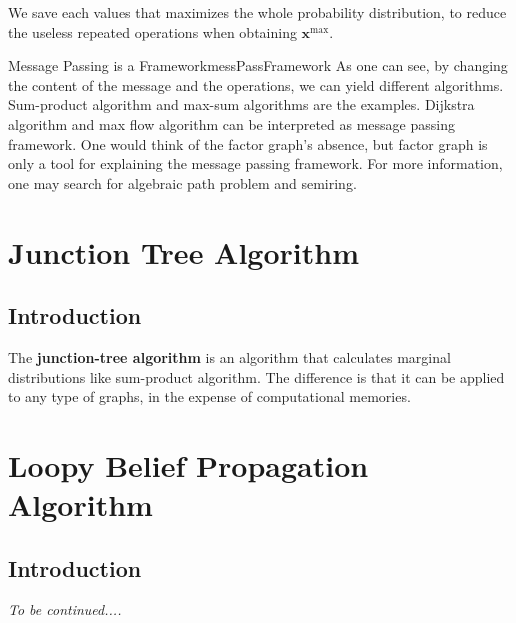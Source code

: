 \documentclass{article}
\begin{document}
        We save each values that maximizes the whole probability distribution, to reduce the
        useless repeated operations when obtaining $\textbf{x}^{\max}$.

        \begin{rem}{Message Passing is a Framework}{messPassFramework}
            As one can see, by changing the content of the message and the operations, we can yield different algorithms.
            Sum-product algorithm and max-sum algorithms are the examples. Dijkstra algorithm and max flow
            algorithm can be interpreted as message passing framework. One would think of the factor graph's absence, but factor graph is only a tool for
            explaining the message passing framework. For more information, one may search for algebraic path problem and semiring.
        \end{rem}

\section{Junction Tree Algorithm}
    \subsection{Introduction}
        The \textbf{junction-tree algorithm} is an algorithm that calculates marginal distributions like sum-product algorithm.
        The difference is that it can be applied to any type of graphs, in the expense of computational memories.
\section{Loopy Belief Propagation Algorithm}\label{sec:loopyBeliefPropAlg}
    \subsection{Introduction}
        \emph{To be continued....}
\end{document}
